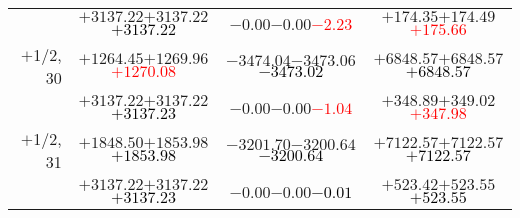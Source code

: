 \documentclass[compress]{beamer}
\begin{document}
\begin{frame}
{\begin{tabular}{r | c | c | c}
           & $+3137.22$\hspace{0.1 cm}$+3137.22$\hspace{0.1 cm}\textcolor{black}{$+3137.22$} & $-0.00$\hspace{0.1 cm}$-0.00$\hspace{0.1 cm}\textcolor{red}{$-2.23$} & $+174.35$\hspace{0.1 cm}$+174.49$\hspace{0.1 cm}\textcolor{red}{$+175.66$} \\
$+$1/2, 30 & $+1264.45$\hspace{0.1 cm}$+1269.96$\hspace{0.1 cm}\textcolor{red}{$+1270.08$} & $-3474.04$\hspace{0.1 cm}$-3473.06$\hspace{0.1 cm}\textcolor{black}{$-3473.02$} & $+6848.57$\hspace{0.1 cm}$+6848.57$\hspace{0.1 cm}\textcolor{black}{$+6848.57$} \\
           & $+3137.22$\hspace{0.1 cm}$+3137.22$\hspace{0.1 cm}\textcolor{black}{$+3137.23$} & $-0.00$\hspace{0.1 cm}$-0.00$\hspace{0.1 cm}\textcolor{red}{$-1.04$} & $+348.89$\hspace{0.1 cm}$+349.02$\hspace{0.1 cm}\textcolor{red}{$+347.98$} \\
$+$1/2, 31 & $+1848.50$\hspace{0.1 cm}$+1853.98$\hspace{0.1 cm}\textcolor{black}{$+1853.98$} & $-3201.70$\hspace{0.1 cm}$-3200.64$\hspace{0.1 cm}\textcolor{black}{$-3200.64$} & $+7122.57$\hspace{0.1 cm}$+7122.57$\hspace{0.1 cm}\textcolor{black}{$+7122.57$} \\
           & $+3137.22$\hspace{0.1 cm}$+3137.22$\hspace{0.1 cm}\textcolor{black}{$+3137.23$} & $-0.00$\hspace{0.1 cm}$-0.00$\hspace{0.1 cm}\textcolor{black}{$-0.01$} & $+523.42$\hspace{0.1 cm}$+523.55$\hspace{0.1 cm}\textcolor{black}{$+523.55$} \\

\end{tabular}}
\end{frame}
\end{document}
